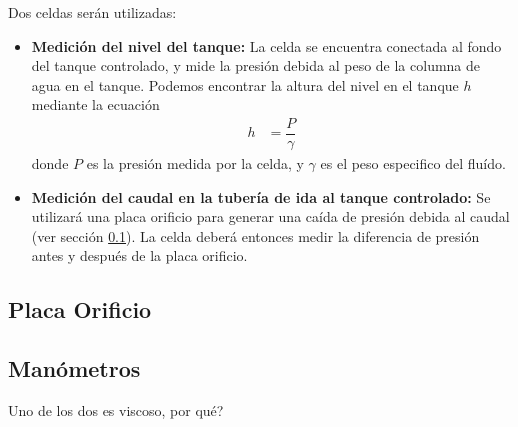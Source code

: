 Dos celdas serán utilizadas:
\begin{itemize}
 \item \textbf{Medición del nivel del tanque:} La celda se encuentra conectada
 al fondo del tanque controlado, y mide la presión debida al peso
 de la columna de agua en el tanque. 
 Podemos encontrar la altura del nivel en el tanque $h$ mediante la ecuación
 \begin{align}
  h &= \dfrac{P}{\gamma}
 \end{align}
donde $P$ es la presión medida por la celda, y $\gamma$ es el peso especifico
del fluído.
\item \textbf{Medición del caudal en la tubería de ida al tanque controlado:}
Se utilizará una placa orificio para generar una caída de presión debida al 
caudal (ver sección \ref{subsec:PlacaOrificio}). 
La celda deberá entonces medir la diferencia de presión antes y después
de la placa orificio.
\end{itemize}


\subsection{Placa Orificio}
\label{subsec:PlacaOrificio}

\subsection{Manómetros}
\label{subsec:Manometros}
Uno de los dos es viscoso, por qué? 
